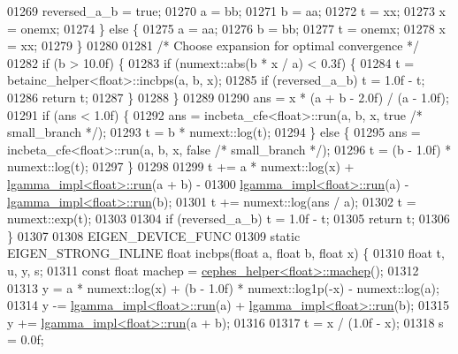 \begin{DoxyCode}
01269       reversed\_a\_b = \textcolor{keyword}{true};
01270       a = bb;
01271       b = aa;
01272       t = xx;
01273       x = onemx;
01274     \} \textcolor{keywordflow}{else} \{
01275       a = aa;
01276       b = bb;
01277       t = onemx;
01278       x = xx;
01279     \}
01280 
01281     \textcolor{comment}{/* Choose expansion for optimal convergence */}
01282     \textcolor{keywordflow}{if} (b > 10.0f) \{
01283       \textcolor{keywordflow}{if} (numext::abs(b * x / a) < 0.3f) \{
01284         t = betainc\_helper<float>::incbps(a, b, x);
01285         \textcolor{keywordflow}{if} (reversed\_a\_b) t = 1.0f - t;
01286         \textcolor{keywordflow}{return} t;
01287       \}
01288     \}
01289 
01290     ans = x * (a + b - 2.0f) / (a - 1.0f);
01291     \textcolor{keywordflow}{if} (ans < 1.0f) \{
01292       ans = incbeta\_cfe<float>::run(a, b, x, \textcolor{keyword}{true} \textcolor{comment}{/* small\_branch */});
01293       t = b * numext::log(t);
01294     \} \textcolor{keywordflow}{else} \{
01295       ans = incbeta\_cfe<float>::run(a, b, x, \textcolor{keyword}{false} \textcolor{comment}{/* small\_branch */});
01296       t = (b - 1.0f) * numext::log(t);
01297     \}
01298 
01299     t += a * numext::log(x) + \hyperlink{struct_eigen_1_1internal_1_1lgamma__impl}{lgamma\_impl<float>::run}(a + b) -
01300          \hyperlink{struct_eigen_1_1internal_1_1lgamma__impl}{lgamma\_impl<float>::run}(a) - 
      \hyperlink{struct_eigen_1_1internal_1_1lgamma__impl}{lgamma\_impl<float>::run}(b);
01301     t += numext::log(ans / a);
01302     t = numext::exp(t);
01303 
01304     \textcolor{keywordflow}{if} (reversed\_a\_b) t = 1.0f - t;
01305     \textcolor{keywordflow}{return} t;
01306   \}
01307 
01308   EIGEN\_DEVICE\_FUNC
01309   \textcolor{keyword}{static} EIGEN\_STRONG\_INLINE \textcolor{keywordtype}{float} incbps(\textcolor{keywordtype}{float} a, \textcolor{keywordtype}{float} b, \textcolor{keywordtype}{float} x) \{
01310     \textcolor{keywordtype}{float} t, u, y, s;
01311     \textcolor{keyword}{const} \textcolor{keywordtype}{float} machep = \hyperlink{struct_eigen_1_1internal_1_1cephes__helper}{cephes\_helper<float>::machep}();
01312 
01313     y = a * numext::log(x) + (b - 1.0f) * numext::log1p(-x) - numext::log(a);
01314     y -= \hyperlink{struct_eigen_1_1internal_1_1lgamma__impl}{lgamma\_impl<float>::run}(a) + 
      \hyperlink{struct_eigen_1_1internal_1_1lgamma__impl}{lgamma\_impl<float>::run}(b);
01315     y += \hyperlink{struct_eigen_1_1internal_1_1lgamma__impl}{lgamma\_impl<float>::run}(a + b);
01316 
01317     t = x / (1.0f - x);
01318     s = 0.0f;

\end{DoxyCode}
